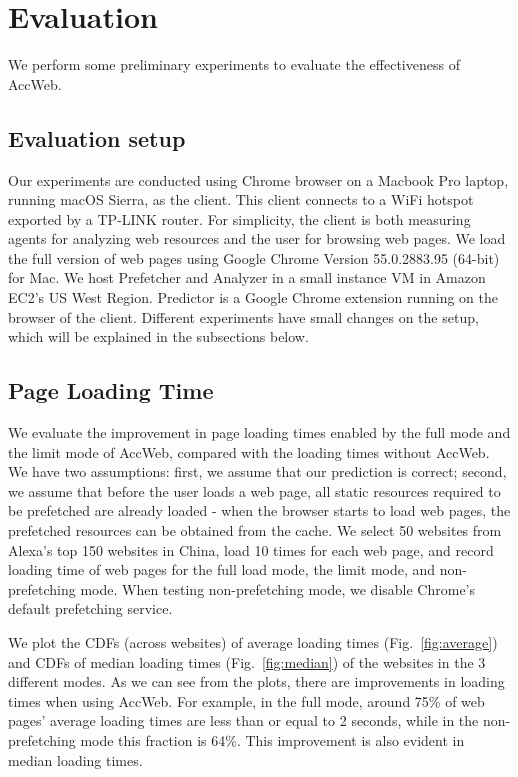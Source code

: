 \section{Evaluation}
\label{sec:eval}

We perform some preliminary experiments to evaluate the effectiveness of AccWeb.

\subsection{Evaluation setup}

Our experiments are conducted using Chrome browser on a Macbook Pro laptop, running macOS Sierra, as the client. This client connects to a WiFi hotspot exported by a TP-LINK router. For simplicity, the client is both measuring agents for analyzing web resources and the user for browsing web pages. We load the full version of web pages using Google Chrome Version 55.0.2883.95 (64-bit) for Mac. We host Prefetcher and Analyzer in a small instance VM in Amazon EC2's US West Region. Predictor is a Google Chrome extension running on the browser of the client. Different experiments have small changes on the setup, which will be explained in the subsections below.


\subsection{Page Loading Time}

We evaluate the improvement in page loading times enabled by the full mode and the limit mode of AccWeb, compared with the loading times without AccWeb. We have two assumptions: first, we assume that our prediction is correct; second, we assume that before the user loads a web page, all static resources required to be prefetched are already loaded - when the browser starts to load web pages, the prefetched resources can be obtained from the cache. We select 50 websites from Alexa's top 150 websites in China, load 10 times for each web page, and record loading time of web pages for the full load mode, the limit mode, and non-prefetching mode. When testing non-prefetching mode, we disable Chrome's default prefetching service.


We plot the CDFs (across websites) of average loading times (Fig.~\ref{fig:average}) and CDFs of median loading times (Fig.~\ref{fig:median}) of the websites in the 3 different modes. As we can see from the plots, there are improvements in loading times when using AccWeb. For example, in the full mode, around 75\% of web pages' average loading times are less than or equal to 2 seconds, while in the non-prefetching mode this fraction is 64\%. This improvement is also evident in median loading times.

